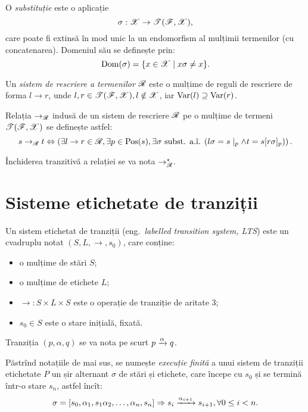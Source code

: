 O \emph{substituție} este o aplicație 
\[
    \sigma : \mathscr{X} \to \mathscr{T}(\mathscr{F}, \mathscr{X}),
\]
care poate fi extinsă în mod unic la un endomorfism al mulțimii
termenilor (cu concatenarea). Domeniul său se definește prin:
\[
    \mathrm{Dom}(\sigma) = \{ x \in \mathscr{X} \mid x\sigma \neq x \}.
\]

Un \emph{sistem de rescriere a termenilor} $ \mathscr{R} $ este o mulțime
de reguli de rescriere de forma $ l \to r $, unde
$ l, r \in \mathscr{T}(\mathscr{F}, \mathscr{X}), l \notin \mathscr{X} $, iar
$ \mathrm{Var}(l) \supseteq \mathrm{Var}(r) $.

Relația $ \to_\mathscr{R} $ indusă de un sistem de rescriere $ \mathscr{R} $
pe o mulțime de termeni $ \mathscr{T}(\mathscr{F}, \mathscr{X}) $ se definește
astfel:
\[
    s \to_\kal{R} t \Leftrightarrow \left( \exists l \to r \in \kal{R}, %
        \exists p \in \dr{Pos}(s), \exists \sigma \text{ subst. a.î. } %
    (l\sigma = s\mid_p \land t = s [r\sigma]_p) \right).
\]

Închiderea tranzitivă a relației se va nota $ \to^\ast_\mathscr{R} $.

\section{Sisteme etichetate de tranziții}

Un sistem etichetat de tranziții (eng.\ \emph{labelled transition system, LTS})
este un cvadruplu notat $ (S, L, \to, s_0) $, care conține:
\begin{itemize}
\item o mulțime de stări $ S $;
\item o mulțime de etichete $ L $;
\item $ \to : S \times L \times S $ este o operație de tranziție de
  aritate 3;
\item $ s_0 \in S $ este o stare inițială, fixată.
\end{itemize}

Tranziția $ (p, \alpha, q) $ se va nota pe scurt $ p \xrightarrow{\alpha} q $.

Păstrînd notațiile de mai sus, se numește \emph{execuție finită} a unui
sistem de tranziții etichetate $ P $ un șir alternant $ \sigma $ de stări
și etichete, care începe cu $ s_0 $ și se termină într-o stare $ s_n $,
astfel încît:
\[
  \sigma = \left[ s_0, \alpha_1, s_1 \alpha_2, \dots, \alpha_n, s_n \right] %
  \Rightarrow s_i \xrar{\alpha_{i+1}} s_{i + 1}, \forall 0 \leq i < n.
\]

